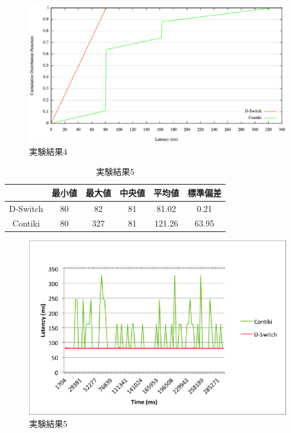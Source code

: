 \begin{figure}[htbp]
 \begin{center}
  \includegraphics[width=120mm]{./images/cdf4.eps}
 \end{center}
 \caption{実験結果4}
 \label{fig:cdf4}
\end{figure}



\begin{table}[htbp]
  \centering
  \caption{実験結果5}
  \begin{tabular}{|c||c|c|c|c|c|} \hline
    \backslashbox{}{} & 最小値 & 最大値 & 中央値 & 平均値 & 標準偏差 \\ \hline \hline
    D-Switch & 80 & 82 & 81 & 81.02 & 0.21 \\ \hline
    Contiki & 80 & 327 & 81 & 121.26 & 63.95 \\ \hline
  \end{tabular}
  \label{tab:latency5}
\end{table}

\begin{figure}[htbp]
 \begin{center}
  \includegraphics[width=120mm]{./images/latency5.eps}
 \end{center}
 \caption{実験結果5}
 \label{fig:latency5}
\end{figure}

